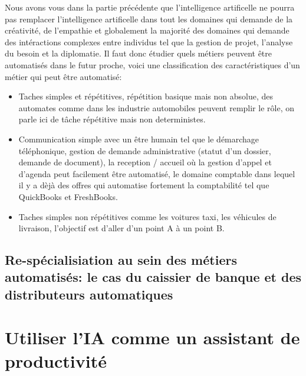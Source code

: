         Nous avons vous dans la partie précédente que l'intelligence artificelle
        ne pourra pas remplacer l'intelligence artificelle dans tout 
        les domaines qui demande de la créativité, de l'empathie et globalement 
        la majorité des domaines qui demande des intéractions complexes entre 
        individus tel que la gestion de projet, l'analyse du besoin et la 
        diplomatie. Il faut donc étudier quels métiers peuvent être automatisés dans le futur proche,
        voici une classification des caractéristiques d'un métier qui peut être automatisé:
        \newline
        \begin{itemize}
            \item Taches simples et répétitives, répétition basique mais non absolue, des automates 
            comme dans les industrie automobiles peuvent remplir le rôle, on parle ici de tâche 
            répétitive mais non deterministes.
            \newline

            \item Communication simple avec un être humain tel que le démarchage téléphonique,
            gestion de demande administrative (statut d'un dossier, demande de document), 
            la reception / accueil où la gestion d'appel et d'agenda peut facilement être automatisé,
            le domaine comptable dans lequel il y a dèjà des offres qui automatise fortement 
            la comptabilité tel que QuickBooks et FreshBooks.
            \newline

            \item Taches simples non répétitives comme 
            les voitures taxi, les véhicules de livraison, l'objectif est d'aller d'un point A à 
            un point B. \newline
        \end{itemize}
        
        \section{Re-spécialisiation au sein des métiers automatisés: le cas du caissier
        de banque et des distributeurs automatiques}

        

    \chapter{Utiliser l'IA comme un assistant de productivité}
